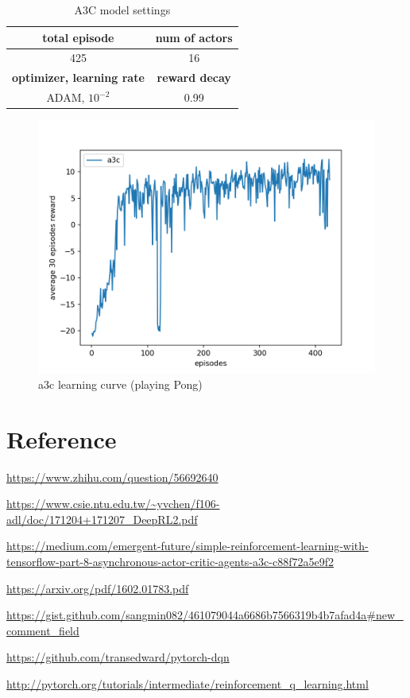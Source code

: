 \documentclass[12pt, a4paper]{article}
\begin{document}
\begin{CJK}{UTF8}{bkai}
\begin{table}[!htb]
\centering
\begin{tabular}{|c|c|}
\hline
{\textbf{total episode}} & {\textbf{num of actors}}\\
\hline
{425} & {16}\\
\hline
\hline
{\textbf{optimizer, learning rate}} & {\textbf{reward decay}} \\
\hline
{ADAM, $10^{-2}$} & {0.99}\\
\hline

\end{tabular} 
\caption{A3C model settings}
\label{table:3}
\end{table}

\begin{figure}[!htb]
\centering
\includegraphics[scale=0.7]{a3c_avg_reward.png}
\caption{a3c learning curve (playing Pong)}
\label{fig:f11}
\end{figure}

\section{Reference}
\noindent

\url{https://www.zhihu.com/question/56692640}\par
\url{https://www.csie.ntu.edu.tw/~yvchen/f106-adl/doc/171204+171207_DeepRL2.pdf}\par
\url{https://medium.com/emergent-future/simple-reinforcement-learning-with-tensorflow-part-8-asynchronous-actor-critic-agents-a3c-c88f72a5e9f2}\par
\url{https://arxiv.org/pdf/1602.01783.pdf}\par
\url{https://gist.github.com/sangmin082/461079044a6686b7566319b4b7afad4a#new_comment_field}\par
\url{https://github.com/transedward/pytorch-dqn}\par
\url{http://pytorch.org/tutorials/intermediate/reinforcement_q_learning.html}\par
\end{CJK}
\end{document}
